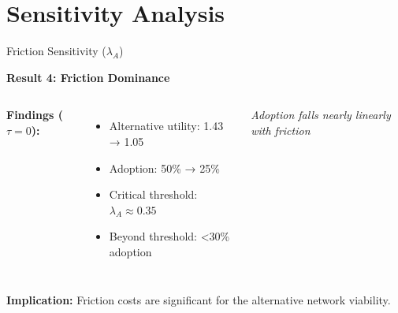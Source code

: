 \documentclass[aspectratio=169]{beamer}
\begin{document}
\section{Sensitivity Analysis}

\begin{frame}{Friction Sensitivity ($\lambda_A$)}
    
    \textbf{Result 4: Friction Dominance}
    
    \vspace{0.3cm}
    \begin{columns}
        \textbf{Findings ($\tau = 0$):}
        \begin{itemize}
            \item Alternative utility: 1.43 → 1.05
            \item Adoption: 50\% → 25\%
            \item \textcolor{AlertRed}{Critical threshold: $\lambda_A \approx 0.35$}
            \item Beyond threshold: <30\% adoption
        \end{itemize}
                
        \centering
        
        \vspace{0.3cm}
        \small{\textit{Adoption falls nearly linearly with friction}}
    \end{columns}
    
    \vspace{0.3cm}
    \textbf{Implication:} Friction costs are significant for the alternative network viability.

\end{frame}
\end{document}
